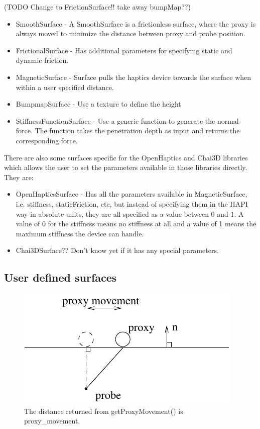(TODO Change to FrictionSurface!! take away bumpMap??)
\begin{itemize}
\item SmoothSurface - A SmoothSurface is a frictionless surface, where
  the proxy is always moved to minimize the distance between proxy and
  probe position. 
\item FrictionalSurface - Has additional parameters for specifying
  static and dynamic friction.
\item MagneticSurface - Surface pulls the haptics device towards the
  surface when within a user specified distance.
\item BumpmapSurface - Use a texture to define the height 
\item StiffnessFunctionSurface - Use a generic function to generate
  the normal force. The function takes the penetration depth as input
  and returns the corresponding force. 
\end{itemize}

There are also some surfaces specific for the OpenHaptics and Chai3D
libraries which allows the user to set the parameters available in
those libraries directly. They are:
\begin{itemize}
\item OpenHapticsSurface - Has all the parameters available in
  MagneticSurface, i.e. stiffness, staticFriction, etc, but instead of
  specifying them in the HAPI way in absolute units, they are all
  specified as a value between 0 and 1. A value of 0 for the stiffness
  means no stiffness at all and a value of 1 means the maximum
  stiffness the device can handle.
\item Chai3DSurface?? Don't know yet if it has any special parameters.
\end{itemize}

\subsection{User defined surfaces}

\begin{figure} 
  \centering 
  \includegraphics{images/surface.pdf}
  \caption{The distance returned from getProxyMovement() is proxy\_movement.}
  \label{proxy movement} 
\end{figure}


